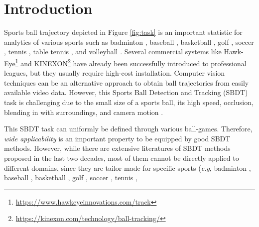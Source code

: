 \documentclass{bmvc2k}
\def\eg{\emph{e.g}\bmvaOneDot}
\begin{document}
\section{Introduction}
\label{sec:intro}
Sports ball trajectory depicted in Figure \ref{fig:task} is an important statistic for analytics of various sports such as
badminton \cite{wang+2022aaai},
baseball \cite{shum+2004icme},
basketball \cite{fu+2011vcip},
golf \cite{huang+2012icppw},
soccer \cite{theagarajan+cvpr2018,sarkar+2019cvprw},
tennis \cite{pingali+2000icpr},
table tennis \cite{desai+2005prmi},
and
volleyball \cite{cheng+2016icassp}.
Several commercial systems like Hawk-Eye\footnote{\url{https://www.hawkeyeinnovations.com/track}} and KINEXON\footnote{\url{https://kinexon.com/technology/ball-tracking/}} have already been successfully introduced to professional leagues, but they usually require high-cost installation.
Computer vision techniques can be an alternative approach to obtain ball trajectories from easily available video data.
However, this Sports Ball Detection and Tracking (SBDT) task is challenging due to the small size of a sports ball, its high speed, occlusion, blending in with surroundings, and camera motion \cite{yu+2003acmmm}.
\par
This SBDT task can uniformly be defined through various ball-games.
Therefore, {\it wide applicability} is an important property to be equipped by good SBDT methods.
However, while there are extensive literatures of SBDT methods proposed in the last two decades, most of them cannot be directly applied to different domains, since they are tailor-made for specific sports
(\eg,
badminton \cite{chen+2007tst},
baseball \cite{shum+2004icme},
basketball \cite{chen+2009jvcir,chakraborty+2011sic,chakraborty+2012icspcc,chakraborty+2013indicon,chakraborty+2013jo},
golf \cite{lyu+2015icia,lyu+2017ijsr},
soccer \cite{ohno+1999mfi,ohno+2000icpr,yu+2003acmmm,yu+2003icme,yu+2003icme2,choi+2004smvp,tong+2004icpr,yu+2004acmmm,choi+2005iciap,li+2005avss,liang+2005pcm,yu+2005icme,liu+2006ivc,ren+2006eccvw,shimawaki+2006icpr,yu+2006tmm,ishii+2007pcm,liang+2007tce,misu+2007icassp,yu+2007icme,yu+2007avc,ariki+2008icme,huang+2008icpr,pallavi+2008jvcir,ren+2008tcsvt,zhu+2008civr,beetz+2009ijcss,dorazio+2009avss,dorazio+2009tcsvt,dorazio+2009cviu,kim+2009cgiv,miura+2009cviu,ren+2009cviu,zhu+2009tmm,rao+2015iccsp},
tennis \cite{pingali+2000icpr,lepetit+2003cvpr,yu+2004icip,kittler+2005ia,yan+2005bmvc,kittler+2007iciap,yu+2007vcip,ekinci+2008vis,yan+2008tpami,conaire+2009icdsp,yu+2009cviu,teachabarikiti+2010icca,wong+2010ics,huang+2011avsp,almajai+2012dir,huang+2012apsipa,zhou+2013icassp,yan+2014cvs,archana+2015pcs,zhou+2015tmm,reno+2016tishw,yuan+2016scis},
\end{document}
